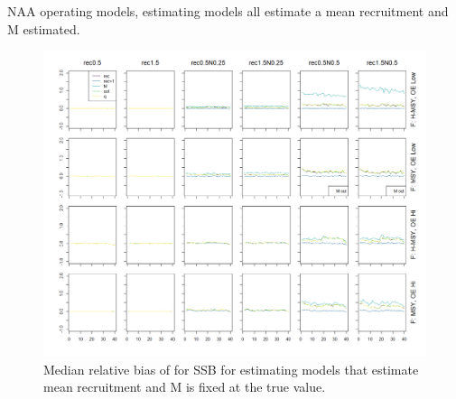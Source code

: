 \documentclass[
  12pt,
]{article}
\begin{document}
\begin{table}
\caption{NAA operating models, estimating models all estimate a mean recruitment and M estimated.}
{}
\end{table}
\clearpage

\begin{landscape}
\begin{figure}
\caption{Median relative bias of for SSB for estimating models that estimate mean recruitment and M is fixed at the true value.}\label{naa_om_em_R_MF_relbias_ssb}
\begin{center}
\includegraphics[width = \textwidth]{naa_om_R_MF_relbias_ssb.png}
\end{center}
\end{figure}
\end{landscape}
\end{document}
